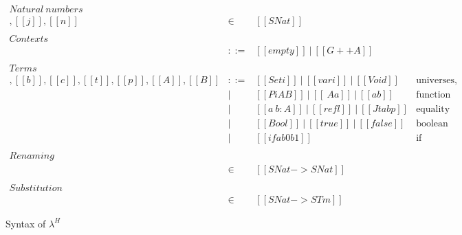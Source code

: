 \documentclass[acmsmall]{acmart}
\newcommand{\lang}{$\lambda^H$\xspace}
\begin{document}
\begin{figure}[h]
\[
\begin{array}{lcll}
\mathit{Natural\ numbers}\\
[[i]],[[j]],[[n]] & \in &  [[SNat]] &  \\ \\

\mathit{Contexts}\\
[[G]]       & ::= & [[empty]]\ |\ [[G ++ A]] &  \\ \\
\mathit{Terms}\\
[[a]],[[b]],[[c]],[[t]],[[p]],[[A]],[[B]] & ::= & [[Set i]]\ |\ [[var i]]\  |\ [[Void]]
                  & \mbox{universes, variables, empty type} \\
            & |   & [[Pi A B]]\ |\ [[\ A a]]\ |\ [[a b]]
                  & \mbox{function types, abstractions, applications} \\
            & |   & [[a ~ b : A ]]\ |\  [[refl]]\ |\ [[J t a b p]]
                  & \mbox{equality types, reflexivity proof, J eliminator} \\
            & |   & [[Bool]]\ |\  [[true]]\ |\  [[false]]\ %
                  & \mbox{boolean type, true, false} \\
            & |   & [[if a b0 b1]]
                  & \mbox{if} \\ \\
\mathit{Renaming}\\
[[xi]] & \in & [[SNat -> SNat]] & \\ \\
\mathit{Substitution}\\
[[rho]] & \in & [[SNat -> STm]] &
\end{array}
\]
  \caption{Syntax of \lang}
  \label{fig:syntax}
\end{figure}

\end{document}
